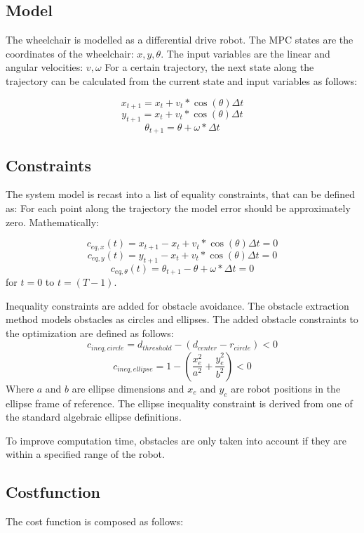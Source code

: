 \documentclass[a4paper,10pt]{article}
\begin{document}
\subsection{Model}
The wheelchair is modelled as a differential drive robot. 
The MPC states are the coordinates of the wheelchair: \(x, y, \theta \). 
The input variables are the linear and angular velocities: \(v, \omega \)
For a certain trajectory, the next state along the trajectory can be calculated from the current state and input variables as follows:

\[ 		x_{t+1} = x_t + v_t * \cos (\theta) \Delta t\]
\[ 		y_{t+1} = x_t + v_t * \cos (\theta) \Delta t\]
\[ 		\theta_{t+1} = \theta + \omega * \Delta t \]

\subsection{Constraints}

The system model is recast into a list of equality constraints, that can be defined as: For each point along the trajectory the model error should be approximately zero. Mathematically:

\[ 		c_{eq,x}(t) = x_{t+1} - x_t + v_t * \cos (\theta) \Delta t = 0 \]
\[ 		c_{eq,y}(t) = y_{t+1} - x_t + v_t * \cos (\theta) \Delta t = 0 \]
\[ 		c_{eq,\theta}(t) = \theta_{t+1} - \theta + \omega * \Delta t = 0 \]
for \( t = 0 \) to \( t = (T-1) \).

Inequality constraints are added for obstacle avoidance. 
The obstacle extraction method models obstacles as circles and ellipses. 
The added obstacle constraints to the optimization are defined as follows:
\[ 		c_{ineq,circle} = d_{threshold} - (d_{center} - r_{circle}) < 0 \]
\[ 		c_{ineq,ellipse} = 1 - (\frac{x_e^2}{a^2} + \frac{y_e^2}{b^2}) < 0 \]
Where \( a \) and \( b \) are ellipse dimensions and \( x_e \) and \( y_e \) are robot positions in the ellipse frame of reference. The ellipse inequality constraint is derived from one of the standard algebraic ellipse definitions. 

To improve computation time, obstacles are only taken into account if they are within a specified range of the robot.

\subsection{Costfunction}

The cost function is composed as follows:
\end{document}
